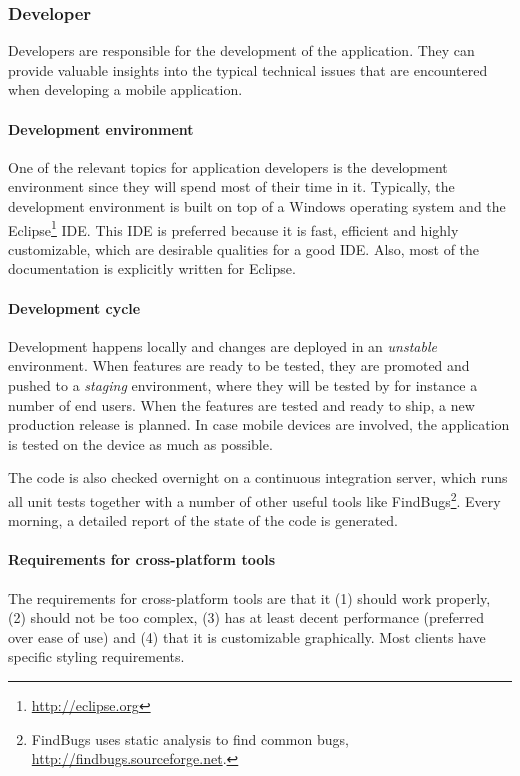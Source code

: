 \subsubsection{Developer}

Developers are responsible for the development of the application. They can provide valuable insights into the typical technical issues that are encountered when developing a mobile application.

\paragraph{Development environment}

One of the relevant topics for application developers is the development environment since they will spend most of their time in it. Typically, the development environment is built on top of a Windows operating system and the Eclipse\footnote{\url{http://eclipse.org}} IDE. This IDE is preferred because it is fast, efficient and highly customizable, which are desirable qualities for a good IDE. Also, most of the documentation is explicitly written for Eclipse. 

\paragraph{Development cycle}

Development happens locally and changes are deployed in an \emph{unstable}  environment. When features are ready to be tested, they are promoted and pushed to a \emph{staging} environment, where they will be tested by for instance a number of end users. When the features are tested and ready to ship, a new production release is planned. In case mobile devices are involved, the application is tested on the device as much as possible.

The code is also checked overnight on a continuous integration server, which runs all unit tests together with a number of other useful tools like FindBugs\footnote{FindBugs uses static analysis to find common bugs, \url{http://findbugs.sourceforge.net}.}. Every morning, a detailed report of the state of the code is generated.

\paragraph{Requirements for cross-platform tools}

The requirements for cross-platform tools are that it (1) should work properly, (2) should not be too complex, (3) has at least decent performance (preferred over ease of use) and (4) that it is customizable graphically. Most clients have specific styling requirements.

